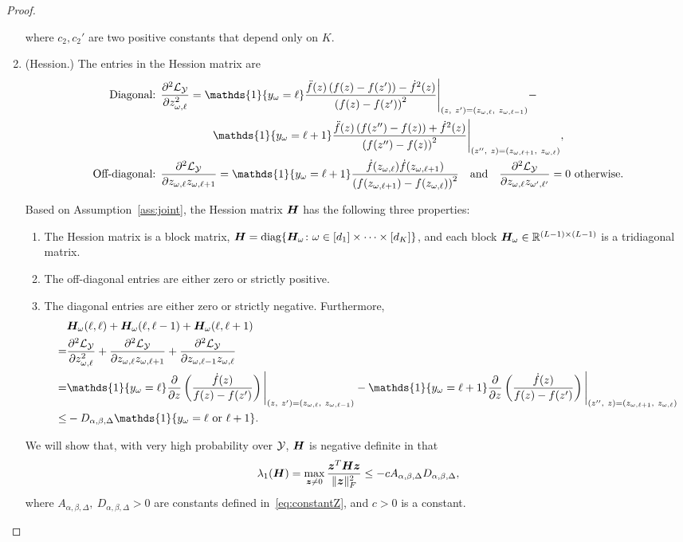 \documentclass{article}
\theoremstyle{plain}
\theoremstyle{definition}
\begin{document}
\begin{proof}
\begin{enumerate}
where $c_2,c_2'$ are two positive constants that depend only on $K$.
\item (Hession.) The entries in the Hession matrix are
\begin{align}
\text{Diagonal: }&{\partial^2 \tL_\tY\over \partial z^2_{\omega,\ell}}=\mathds{1}\{y_\omega=\ell\}{\ddot{f}(z)\left(f(z)-f(z')\right)-\dot{f}^2(z)\over \left(f(z)-f(z')\right)^2}\Bigg|_{(z,\ z')=(z_{\omega,\ell},\ z_{\omega,\ell-1})}-\\
&\hspace{.65in}\mathds{1}\{y_\omega=\ell+1\}{\ddot{f}(z)\left(f(z'')-f(z)\right)+\dot{f}^2(z)\over \left(f(z'')-f(z)\right)^2}\Bigg|_{(z'',\ z)=(z_{\omega,\ell+1},\ z_{\omega,\ell})},\\
\text{Off-diagonal: }&
{\partial^2 \tL_\tY\over \partial z_{\omega,\ell}z_{\omega,\ell+1}}=\mathds{1}\{y_\omega=\ell+1\}{\dot{f}(z_{\omega,\ell})\dot{f}(z_{\omega,\ell+1})\over \left(f(z_{\omega,\ell+1})-f(z_{\omega,\ell})\right)^2}\quad \text{and}\quad {\partial^2 \tL_\tY\over \partial z_{\omega,\ell}z_{\omega',\ell'}}=0 \text{ otherwise}. 
\end{align}

Based on Assumption~\ref{ass:joint}, the Hession matrix $\bm{H}$ has the following three properties:
\begin{enumerate}
\item The Hession matrix is a block matrix, $\bm{H}=\text{diag}\{\bm{H}_\omega\colon \omega\in[d_1]\times \cdots \times [d_K]\}$, and each block $\bm{H}_{\omega}\in\mathbb{R}^{(L-1)\times (L-1)}$ is a tridiagonal matrix. 
\item The off-diagonal entries are either zero or strictly positive.
\item The diagonal entries are either zero or strictly negative. Furthermore, 
\begin{align}
&\mH_\omega(\ell,\ell)+ \mH_\omega(\ell,\ell-1)+\mH_\omega(\ell,\ell+1)\\
=&{\partial^2 \tL_\tY\over \partial z^2_{\omega,\ell}}+{\partial^2 \tL_\tY\over \partial z_{\omega,\ell}z_{\omega,\ell+1}}+{\partial^2 \tL_\tY\over \partial z_{\omega,\ell-1}z_{\omega,\ell}}\\
=&\mathds{1}\{y_\omega=\ell\}{\partial\over \partial z}\left({\dot{f}(z) \over f(z)-f(z')}\right)\Bigg|_{(z,\ z')=(z_{\omega,\ell},\ z_{\omega,\ell-1})}  -\mathds{1}\{y_\omega=\ell+1\}{\partial\over \partial z}\left({\dot{f}(z) \over f(z)-f(z')}\right)\Bigg|_{(z'',\ z)=(z_{\omega,\ell+1},\ z_{\omega,\ell})}\\
\leq &-D_{\alpha,\beta,\Delta}\mathds{1}\{y_\omega = \ell \text{ or } \ell+1\}.
\end{align}
\end{enumerate}
We will show that, with very high probability over $\mathcal{Y}$, $\bm{H}$ is negative definite in that
\begin{equation}\label{eq:HessionZ}
\lambda_{1}(\bm{H})=\max_{\bm{z}\neq 0}{\bm{z}^T\bm{H}\bm{z}\over\lVert\bm{z}\rVert_F^2} \leq - cA_{\alpha,\beta,\Delta}D_{\alpha,\beta,\Delta},
\end{equation}
where $A_{\alpha,\beta,\Delta},\ D_{\alpha,\beta,\Delta}>0$ are constants defined in~\eqref{eq:constantZ}, and $c>0$ is a constant. 


\end{enumerate}
\end{proof}
\end{document}
